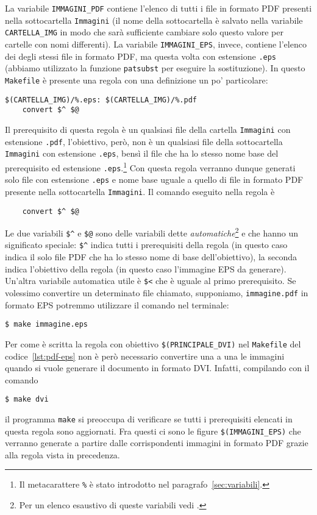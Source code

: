 La variabile \texttt{IMMAGINI\_PDF} contiene l'elenco di tutti i file in formato
\textsc{PDF} presenti nella sottocartella \texttt{Immagini} (il nome della
sottocartella è salvato nella variabile \texttt{CARTELLA\_IMG} in modo che sarà
sufficiente cambiare solo questo valore per cartelle con nomi differenti).  La
variabile \texttt{IMMAGINI\_EPS}, invece, contiene l'elenco dei degli stessi
file in formato \textsc{PDF}, ma questa volta con estensione \texttt{.eps}
(abbiamo utilizzato la funzione \texttt{patsubst} per eseguire la sostituzione).
In questo \texttt{Makefile} è presente una regola con una definizione un po'
particolare:
\begin{lstlisting}
$(CARTELLA_IMG)/%.eps: $(CARTELLA_IMG)/%.pdf
	convert $^ $@
\end{lstlisting} %
Il prerequisito di questa regola è un qualsiasi file della cartella
\texttt{Immagini} con estensione \texttt{.pdf}, l'obiettivo, però, non è un
qualsiasi file della sottocartella \texttt{Immagini} con estensione
\texttt{.eps}, bensì il file che ha lo stesso nome base del prerequisito ed
estensione
\texttt{.eps}.\footnote{Il metacarattere \texttt{\%} è stato introdotto nel
  paragrafo~\ref{sec:variabili}.}
Con questa regola verranno dunque generati solo file con estensione
\texttt{.eps} e nome base uguale a quello di file in formato \textsc{PDF}
presente nella sottocartella \texttt{Immagini}.  Il comando eseguito nella
regola è
\begin{lstlisting}
	convert $^ $@
\end{lstlisting}
Le due variabili \texttt{\$\^} e \texttt{\$@} sono delle variabili dette
\emph{automatiche}\footnote{Per un elenco esaustivo di queste variabili vedi
  \cite[pagina 112]{gnu:make}.}
e che hanno un significato speciale: \texttt{\$\^} indica tutti i prerequisiti
della regola (in questo caso indica il solo file \textsc{PDF} che ha lo stesso
nome di base dell'obiettivo), la seconda indica l'obiettivo della regola (in
questo caso l'immagine \textsc{EPS} da generare).  Un'altra variabile automatica
utile è \texttt{\$<} che è uguale al primo prerequisito.  Se volessimo
convertire un determinato file chiamato, supponiamo, \texttt{immagine.pdf} in
formato \textsc{EPS} potremmo utilizzare il comando nel terminale:
\begin{verbatim}
$ make immagine.eps
\end{verbatim}
Per come è scritta la regola con obiettivo \texttt{\$(PRINCIPALE\_DVI)} nel
\texttt{Makefile} del codice~\ref{lst:pdf-eps} non è però necessario convertire
una a una le immagini quando si vuole generare il documento in formato
\textsc{DVI}.  Infatti, compilando con il comando
\begin{verbatim}
$ make dvi
\end{verbatim}
il programma \texttt{make} si preoccupa di verificare se tutti i prerequisiti
elencati in questa regola sono aggiornati.  Fra questi ci sono le figure
\texttt{\$(IMMAGINI\_EPS)} che verranno generate a partire dalle corrispondenti
immagini in formato \textsc{PDF} grazie alla regola vista in precedenza.

